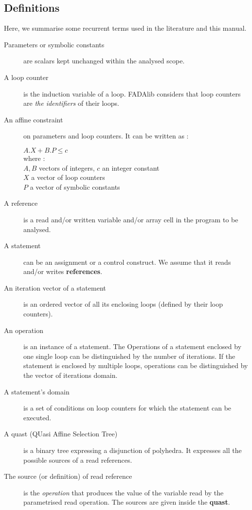 \subsection{Definitions}
Here, we summarise some recurrent terms used in the literature and this manual.
\begin{description}
 \item[Parameters or symbolic constants] are scalars kept unchanged within the analysed scope.
 \item[A loop counter] is the induction variable of a loop. FADAlib considers that loop counters are {\it the identifiers} of their loops.
 \item[An affine constraint] on parameters and loop counters. It can be written as : 

\begin{small} 
\begin{math}
 A.X+B.P \leq c
\end{math}\\
where :\\

$A,B$ vectors of integers, $c$ an integer constant\\
$X$ a vector of loop counters\\
$P$ a vector of symbolic constants\\
\end{small}


 \item[A reference] is a read and/or written variable and/or array cell in the program to be analysed.
 \item[A statement] can be an assignment or a control construct. We assume that it reads and/or writes \textbf{references}.
 \item[An iteration vector of a statement] is an ordered vector of all its enclosing loops (defined by their loop counters).
 \item[An operation] is an instance of a statement. The Operations of a statement enclosed by one single loop can be distinguished by the number of iterations. If the statement is enclosed by multiple loops, operations can be distinguished by the vector of iterations domain.
 \item[A statement's domain] is a set of conditions on loop counters for which the statement can be executed.
 \item[A quast (QUasi Affine Selection Tree)] is a binary tree expressing a disjunction of polyhedra. It expresses all the possible sources of a read references.
 \item[The source (or definition) of read reference ] is the {\it operation} that produces the value of the variable read by the parametrised read operation. The sources are given inside the \textbf{quast}.
\end{description}

